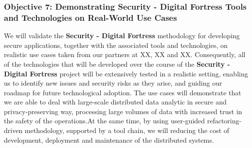 \documentclass[a4paper,11pt]{article}
\newcommand{\project}[1]{\textbf{#1}\xspace}
\newcommand{\SECURITY}{\project{Security - Digital Fortress}}
\newcommand{\TheProject}{\SECURITY}
\begin{document}

\subsubsection*{Objective 7: Demonstrating \TheProject{} Tools and Technologies on Real-World Use Cases}
\vspace{-6pt}
We will validate the \TheProject{} methodology for developing secure applications, together with the associated tools and technologies, on realistic use cases taken from our partners at XX, XX and XX.
Consequently, all of the technologies that will be developed over the course of the \TheProject{} project will be extensively tested in a realistic setting, enabling us to identify new issues and security risks as they arise, and guiding our roadmap for future technological adoption. The use cases will demonstrate that we are able to deal with large-scale distributed data analytic in secure and privacy-preserving way, processing large volumes of data with increased trust in the safety of the operations.At the same time, by using user-guided refactoring-driven methodology, supported by a tool chain, we will reducing the cost of development, deployment and maintenance of the distributed systems.
\end{document}

